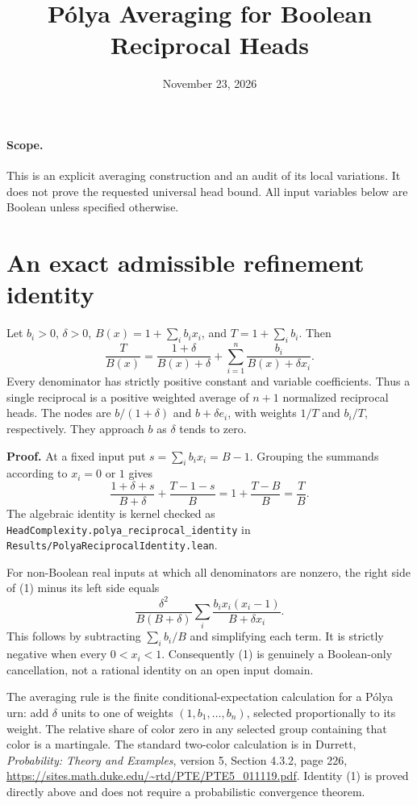 \documentclass[11pt]{article}
\title{P\'olya Averaging for Boolean Reciprocal Heads}
\author{}
\date{November 23, 2026}
\begin{document}
\maketitle

\paragraph{Scope.}
This is an explicit averaging construction and an audit of its local
variations. It does not prove the requested universal head bound.
All input variables below are Boolean unless specified otherwise.

\section{An exact admissible refinement identity}

Let $b_i>0$, $\delta>0$, $B(x)=1+\sum_i b_i x_i$, and
$T=1+\sum_i b_i$. Then
\[
 \frac{T}{B(x)}=\frac{1+\delta}{B(x)+\delta}
                    +\sum_{i=1}^n\frac{b_i}{B(x)+\delta x_i}.
 \tag{1}
\]
Every denominator has strictly positive constant and variable
coefficients. Thus a single reciprocal is a positive weighted average
of $n+1$ normalized reciprocal heads. The nodes are $b/(1+\delta)$
and $b+\delta e_i$, with weights $1/T$ and $b_i/T$, respectively.
They approach $b$ as $\delta$ tends to zero.

\textbf{Proof.} At a fixed input put $s=\sum_i b_i x_i=B-1$.
Grouping the summands according to $x_i=0$ or $1$ gives
\[
 \frac{1+\delta+s}{B+\delta}
                   +\frac{T-1-s}{B}
 =1+\frac{T-B}{B}=\frac TB.
\]
The algebraic identity is kernel checked as
\texttt{HeadComplexity.polya\_reciprocal\_identity} in
\texttt{Results/PolyaReciprocalIdentity.lean}.

For non-Boolean real inputs at which all denominators are nonzero,
the right side of (1) minus its left side equals
\[
 \frac{\delta^2}{B(B+\delta)}
             \sum_i\frac{b_i x_i(x_i-1)}{B+\delta x_i}.
 \tag{2}
\]
This follows by subtracting $\sum_i b_i/B$ and simplifying each
term. It is strictly negative when every $0<x_i<1$.
Consequently (1) is genuinely a Boolean-only cancellation, not a
rational identity on an open input domain.

The averaging rule is the finite conditional-expectation calculation
for a P\'olya urn: add $\delta$ units to one of weights
$(1,b_1,\ldots,b_n)$, selected proportionally to its weight. The
relative share of color zero in any selected group containing that
color is a martingale. The standard two-color calculation is in
Durrett, \emph{Probability: Theory and Examples}, version 5,
Section 4.3.2, page 226,
\url{https://sites.math.duke.edu/~rtd/PTE/PTE5_011119.pdf}.
Identity (1) is proved directly above and does not require a
probabilistic convergence theorem.
\end{document}
